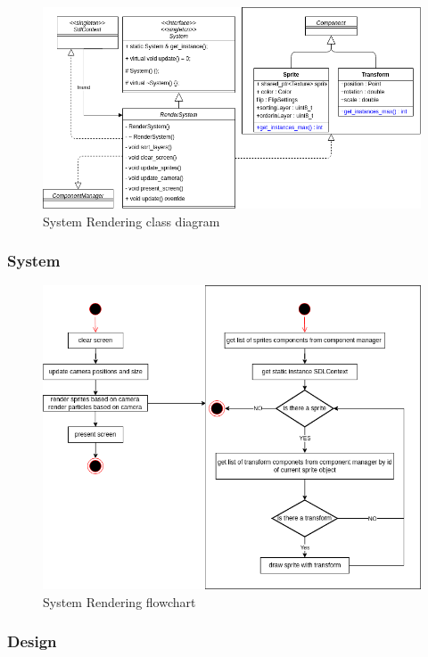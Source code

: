 \documentclass{projdoc}
\begin{document}
\begin{figure}
	\centering
	\includegraphics[width=\textwidth]{img/Rendering.png}
	\caption{System Rendering class diagram}
	\label{fig:class-rendering}
\end{figure}

\subsubsection{System}

\begin{figure}
	\centering
	\includegraphics[width=\textwidth]{img/flowchart_rendering.png}
	\caption{System Rendering flowchart }
	\label{fig:class-renderingflowchart}
\end{figure}

\subsubsection{Design}
\end{document}
